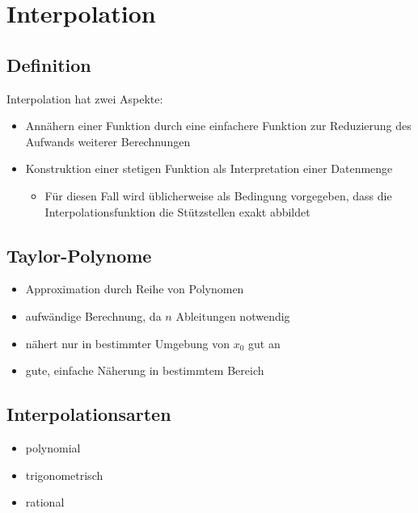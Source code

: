 \documentclass[a4paper, 12pt]{article}
\begin{document}
\section{Interpolation}


\subsection{Definition}
Interpolation hat zwei Aspekte:
\begin{itemize}
  \item Annähern einer Funktion durch eine einfachere Funktion zur Reduzierung des Aufwands weiterer Berechnungen
  \item Konstruktion einer stetigen Funktion als Interpretation einer Datenmenge
    \begin{itemize}
      \renewcommand{\labelitemii}{\Large{!}}%
      \item Für diesen Fall wird üblicherweise als Bedingung vorgegeben, dass die Interpolationsfunktion die Stützstellen exakt abbildet
    \end{itemize}
\end{itemize}


\subsection{Taylor-Polynome}
\begin{itemize}
  \item Approximation durch Reihe von Polynomen
\end{itemize}
\begin{itemize}
  \renewcommand{\labelitemi}{\(-\)}%
  \item aufwändige Berechnung, da \(n\) Ableitungen notwendig
  \item nähert nur in bestimmter Umgebung von \(x_0\) gut an
\end{itemize}
\begin{itemize}
  \renewcommand{\labelitemi}{+}%
  \item gute, einfache Näherung in bestimmtem Bereich
\end{itemize}


\subsection{Interpolationsarten}
\begin{itemize}
  \item polynomial
  \item trigonometrisch
  \item rational
\end{itemize}
\end{document}
